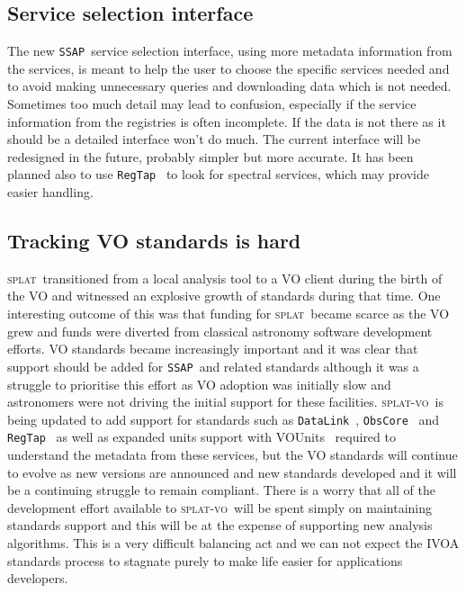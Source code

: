 \documentclass[final,authoryear,5p,times,twocolumn]{elsarticle}
\newcommand{\datalink}{\texttt{DataLink}}
\newcommand{\ssap}{\texttt{SSAP}}
\newcommand{\regtap}{\texttt{RegTap}}
\newcommand{\obscore}{\texttt{ObsCore}}
\newcommand{\vounits}{VOUnits}
\newcommand{\splat}{\textsc{splat}}
\newcommand{\splatvo}{\textsc{splat-vo}}
\begin{document}
\subsection{Service selection interface}

The new \ssap\ service selection interface, using more metadata
information from the services, is meant to help the user to choose the
specific services needed and to avoid making unnecessary queries and
downloading data which is not needed. Sometimes too much detail may
lead to confusion, especially if the service information from the
registries is often incomplete. If the data is not there as it should
be a detailed interface won't do much. The current interface will be
redesigned in the future, probably simpler but more accurate. It has
been planned also to use \regtap\ \citep{regtap} to look for spectral services, which
may provide easier handling.

\subsection{Tracking VO standards is hard}

\splat\ transitioned from a local analysis tool to a VO client during
the birth of the VO and witnessed an explosive growth of standards
during that time. One interesting outcome of this was that funding for
\splat\ became scarce as the VO grew and funds were diverted from
classical astronomy software development efforts. VO standards became
increasingly important and it was clear that support should be added
for \ssap\ and related standards although it was a struggle to
prioritise this effort as VO adoption was initially slow and
astronomers were not driving the initial support for these
facilities. \splatvo\ is being updated to add support for standards
such as \datalink\ \citep{datalink}, \obscore\ \citep{obstap} and \regtap\ \citep{regtap} as well as expanded units support with
\vounits\ \citep{vounits} required to understand the metadata from these
services, but the VO standards will continue to evolve
as new versions are announced and new standards developed and it will
be a continuing struggle to remain compliant. There is a worry that
all of the development effort available to \splatvo\ will be spent
simply on maintaining standards support and this will be at the
expense of supporting new analysis algorithms. This is a very
difficult balancing act and we can not expect the IVOA standards
process to stagnate purely to make life easier for applications
developers.
\end{document}
